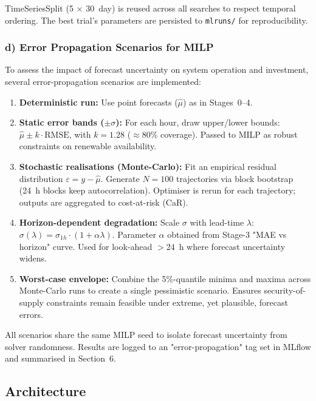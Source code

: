 TimeSeriesSplit (5 $\times$ 30~day) is reused across all searches to respect temporal ordering. The best trial's parameters are persisted to \texttt{mlruns/} for reproducibility.

\subsubsection*{d) Error Propagation Scenarios for MILP}

To assess the impact of forecast uncertainty on system operation and investment, several error-propagation scenarios are implemented:
\begin{enumerate}
    \item \textbf{Deterministic run:} Use point forecasts ($\hat{\mu}$) as in Stages~0--4.
    \item \textbf{Static error bands ($\pm\sigma$):} For each hour, draw upper/lower bounds: $\hat{\mu} \pm k \cdot \text{RMSE}$, with $k=1.28$ ($\approx$80\% coverage). Passed to MILP as robust constraints on renewable availability.
    \item \textbf{Stochastic realisations (Monte-Carlo):} Fit an empirical residual distribution $\varepsilon = y - \hat{\mu}$. Generate $N=100$ trajectories via block bootstrap (24~h blocks keep autocorrelation). Optimiser is rerun for each trajectory; outputs are aggregated to cost-at-risk (CaR).
    \item \textbf{Horizon-dependent degradation:} Scale $\sigma$ with lead-time $\lambda$: $\sigma(\lambda) = \sigma_{1h} \cdot (1 + \alpha \lambda)$. Parameter $\alpha$ obtained from Stage-3 "MAE vs horizon" curve. Used for look-ahead $>$24~h where forecast uncertainty widens.
    \item \textbf{Worst-case envelope:} Combine the 5\%-quantile minima and maxima across Monte-Carlo runs to create a single pessimistic scenario. Ensures security-of-supply constraints remain feasible under extreme, yet plausible, forecast errors.
\end{enumerate}

All scenarios share the same MILP seed to isolate forecast uncertainty from solver randomness. Results are logged to an "error-propagation" tag set in MLflow and summarised in Section~6.

\subsection{Architecture}

\newpage
